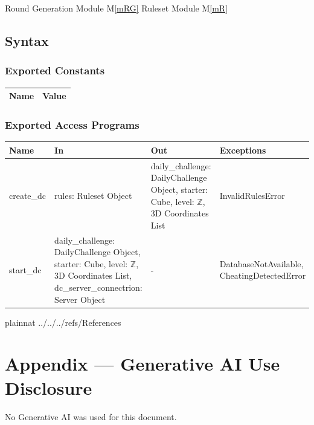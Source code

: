 \documentclass[12pt, titlepage]{article}
\newcommand{\mref}[1]{M\ref{#1}}
\begin{document}
Round Generation Module {\mref{mRG}}
Ruleset Module {\mref{mR}}


\subsection{Syntax}

\subsubsection{Exported Constants}

\begin{center}
\begin{tabular}{p{10cm} p{4cm}}
\hline
\textbf{Name} & \textbf{Value}\\
\hline

\hline
\end{tabular}
\end{center}

\subsubsection{Exported Access Programs}

\begin{center}
\begin{tabular}{p{4cm} p{4cm} p{4cm} p{4cm}}
\hline
\textbf{Name} & \textbf{In} & \textbf{Out} & \textbf{Exceptions} \\
\hline
create\_dc & rules: Ruleset Object & daily\_challenge: DailyChallenge Object, starter: Cube, level: $\mathbb{Z}$, 3D Coordinates List & InvalidRulesError \\
start\_dc & daily\_challenge: DailyChallenge Object, starter: Cube, level: $\mathbb{Z}$, 3D Coordinates List, dc\_server\_connectrion: Server Object & - & DatabaseNotAvailable, CheatingDetectedError \\
\hline
\end{tabular}
\end{center}

 {plainnat}
 {../../../refs/References}

\newpage

\newpage{}

\section{Appendix --- Generative AI Use Disclosure}

No Generative AI was used for this document.
\end{document}
